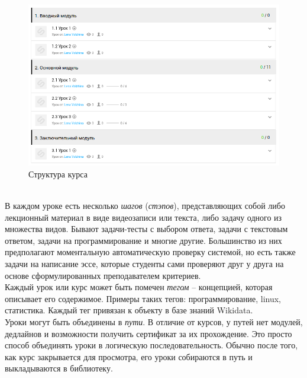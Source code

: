 \documentclass[14pt]{matmex-diploma}
\begin{document}
\begin{figure}[t]
\centering
\includegraphics[width=\linewidth]{images/course_structure.png}
\caption{Структура курса}
\label{fig:course}
\end{figure}

\\\indent В каждом уроке есть несколько \textit{шагов} (\textit{стэпов}), представляющих собой либо лекционный материал в виде видеозаписи или текста, либо задачу одного из множества видов. Бывают задачи-тесты с выбором ответа, задачи с текстовым ответом, задачи на программирование и многие другие. Большинство из них предполагают моментальную автоматическую проверку системой, но есть также задачи на написание эссе, которые студенты сами проверяют друг у друга на основе сформулированных преподавателем критериев.
\\\indent Каждый урок или курс может быть помечен \textit{тегом} -- концепцией, которая описывает его содержимое. Примеры таких тегов: программирование, linux, статистика. Каждый тег привязан к объекту в базе знаний Wikidata\cite{wikidata}.
\\\indent Уроки могут быть объединены в \textit{пути}. В отличие от курсов, у путей нет модулей, дедлайнов и возможности получить сертификат за их прохождение. Это просто способ объединять уроки в логическую последовательность. Обычно после того, как курс закрывается для просмотра, его уроки собираются в путь и выкладываются в библиотеку.
\end{document}

